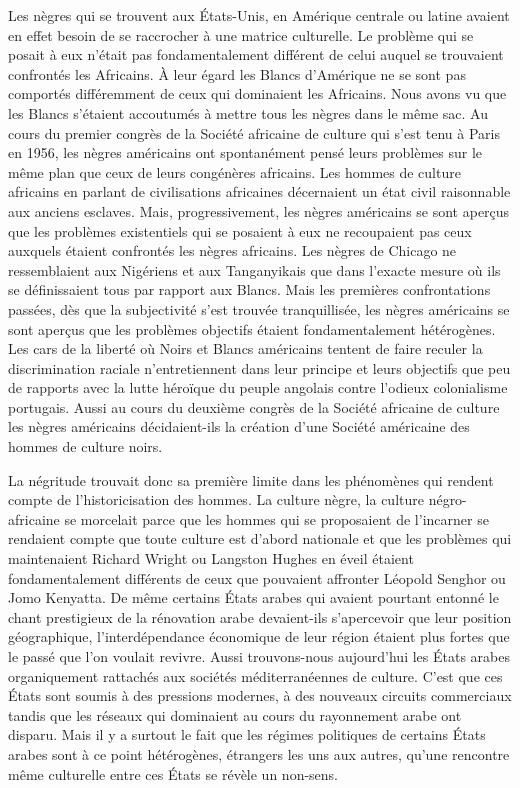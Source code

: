 \documentclass[french,twoside]{book} %
\begin{document}
Les nègres qui se trouvent aux États-Unis, en Amérique centrale ou latine avaient en effet besoin de se raccrocher à une matrice culturelle. Le problème qui se posait à eux n’était pas fondamentalement différent de celui auquel se trouvaient confrontés les Africains. À leur égard les Blancs d’Amérique ne se sont pas comportés différemment de ceux qui dominaient les Africains. Nous avons vu que les Blancs s’étaient accoutumés à mettre tous les nègres dans le même sac. Au cours du premier congrès de la Société africaine de culture qui s’est tenu à Paris en 1956, les nègres américains ont spontanément pensé leurs problèmes sur le même plan que ceux de leurs congénères africains. Les hommes de culture africains en parlant de civilisations africaines décernaient un état civil raisonnable aux anciens esclaves. Mais, progressivement, les nègres américains se sont aperçus que les problèmes existentiels qui se posaient à eux ne recoupaient pas ceux auxquels étaient confrontés les nègres   africains. Les nègres de Chicago ne ressemblaient aux Nigériens et aux Tanganyikais que dans l’exacte mesure où ils se définissaient tous par rapport aux Blancs. Mais les premières confrontations passées, dès que la subjectivité s’est trouvée tranquillisée, les nègres américains se sont aperçus que les problèmes objectifs étaient fondamentalement hétérogènes. Les cars de la liberté où Noirs et Blancs américains tentent de faire reculer la discrimination raciale n’entretiennent dans leur principe et leurs objectifs que peu de rapports avec la lutte héroïque du peuple angolais contre l’odieux colonialisme portugais. Aussi au cours du deuxième congrès de la Société africaine de culture les nègres américains décidaient-ils la création d’une Société américaine des hommes de culture noirs.\par
\bigbreak
\noindent La négritude trouvait donc sa première limite dans les phénomènes qui rendent compte de l’historicisation des hommes. La culture nègre, la culture négro-africaine se morcelait parce que les hommes qui se proposaient de l’incarner se rendaient compte que toute culture est d’abord nationale et que les problèmes qui maintenaient Richard Wright ou Langston Hughes en éveil étaient fondamentalement différents de ceux que pouvaient affronter Léopold Senghor ou Jomo Kenyatta. De même certains États arabes qui avaient pourtant entonné le chant prestigieux de la rénovation arabe devaient-ils s’apercevoir que leur position géographique, l’interdépendance économique de leur région étaient plus fortes que le passé que l’on voulait revivre. Aussi trouvons-nous aujourd’hui les États arabes organiquement rattachés aux sociétés méditerranéennes de culture. C’est que ces États sont soumis à des pressions modernes, à des nouveaux circuits commerciaux tandis que les réseaux qui dominaient au cours du rayonnement arabe ont disparu. Mais il y a surtout le fait que les régimes politiques de certains États arabes sont à ce point hétérogènes, étrangers les uns aux autres, qu’une rencontre même culturelle entre ces États se révèle un non-sens.\par
\end{document}
